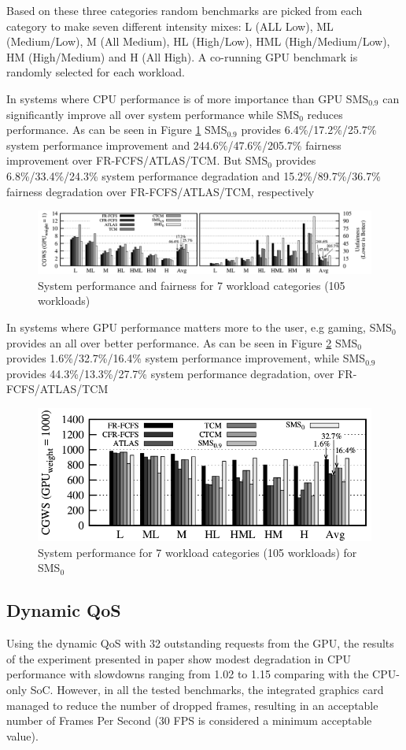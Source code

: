 \documentclass[12pt,journal,compsoc]{IEEEtran}
\begin{document}
Based on these three categories random benchmarks are picked from each category to make seven different intensity mixes: L (ALL Low), ML (Medium/Low), M (All Medium), HL (High/Low),  HML (High/Medium/Low),  HM (High/Medium) and H (All High).  A co-running GPU benchmark is randomly selected for each workload.

In systems where CPU performance is of more importance than GPU SMS$_{0.9}$ can significantly improve all over system performance while SMS$_0$ reduces performance. As can be seen in Figure \ref{fig:SmS_GPU_1} SMS$_{0.9}$ provides 6.4\%/17.2\%/25.7\% system performance improvement and 244.6\%/47.6\%/205.7\% fairness improvement over FR-FCFS/ATLAS/TCM.
But SMS$_0$ provides 6.8\%/33.4\%/24.3\% system performance degradation and 15.2\%/89.7\%/36.7\% fairness degradation over FR-FCFS/ATLAS/TCM, respectively \cite{SmS}

\begin{figure}[H]
	\centering
	\includegraphics[width = 9.2 cm]{graphics/GPU_W_1.png}
	\caption{System performance and fairness for 7 workload categories (105 workloads) \cite{SmS}}\label{fig:SmS_GPU_1}
\end{figure}

In systems where GPU performance matters more to the user, e.g gaming, SMS$_0$ provides an all over better performance.  As can be seen in Figure \ref{fig:SmS_GPU_1000}  SMS$_0$ provides 1.6\%/32.7\%/16.4\% system performance improvement, while SMS$_{0.9}$ provides 44.3\%/13.3\%/27.7\% system performance degradation, over FR-FCFS/ATLAS/TCM

\begin{figure}[H]
	\centering
	\includegraphics[width = 9 cm]{graphics/GPU_W_1000.png}
	\caption{System performance for 7 workload categories (105 workloads) for SMS$_0$ \cite{SmS}}\label{fig:SmS_GPU_1000}
\end{figure}

\subsection{Dynamic QoS}
Using the dynamic QoS with 32 outstanding requests from the GPU, the results of the experiment presented in paper \cite{QoS} show modest degradation in CPU performance with slowdowns ranging from 1.02 to 1.15 comparing with the CPU-only SoC. However, in all the tested benchmarks, the integrated graphics card managed to reduce the number of dropped frames, resulting in an acceptable number of Frames Per Second (30 FPS is considered a minimum acceptable value).
\end{document}
